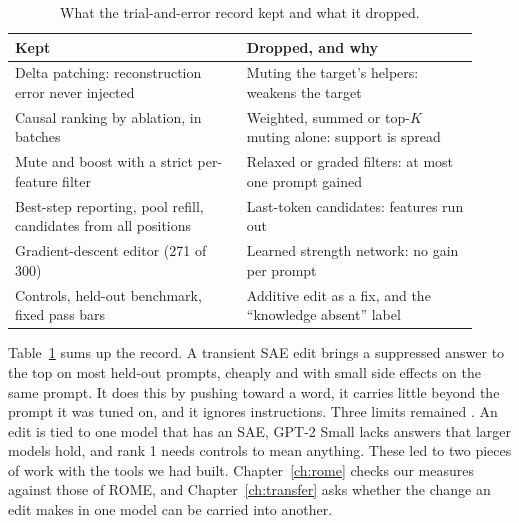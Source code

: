 \begin{table}[t]
\centering\small
\caption{What the trial-and-error record kept and what it dropped.}\label{tab:kept}
\begin{tabular}{|p{0.46\linewidth}|p{0.46\linewidth}|}
\hline
\textbf{Kept} & \textbf{Dropped, and why}\\ \hline
Delta patching: reconstruction error never injected & Muting the target's helpers: weakens the target\\ \hline
Causal ranking by ablation, in batches & Weighted, summed or top-$K$ muting alone: support is spread\\ \hline
Mute and boost with a strict per-feature filter & Relaxed or graded filters: at most one prompt gained\\ \hline
Best-step reporting, pool refill, candidates from all positions & Last-token candidates: features run out\\ \hline
Gradient-descent editor (271 of 300) & Learned strength network: no gain per prompt\\ \hline
Controls, held-out benchmark, fixed pass bars & Additive edit as a fix, and the ``knowledge absent'' label\\ \hline
\end{tabular}
\end{table}

Table~\ref{tab:kept} sums up the record. A transient SAE edit brings a suppressed answer to the top on most held-out prompts, cheaply and with small side effects on the same prompt. It does this by pushing toward a word, it carries little beyond the prompt it was tuned on, and it ignores instructions. Three limits remained \cite{p13,p14}. An edit is tied to one model that has an SAE, GPT-2 Small lacks answers that larger models hold, and rank 1 needs controls to mean anything. These led to two pieces of work with the tools we had built. Chapter~\ref{ch:rome} checks our measures against those of ROME, and Chapter~\ref{ch:transfer} asks whether the change an edit makes in one model can be carried into another.
